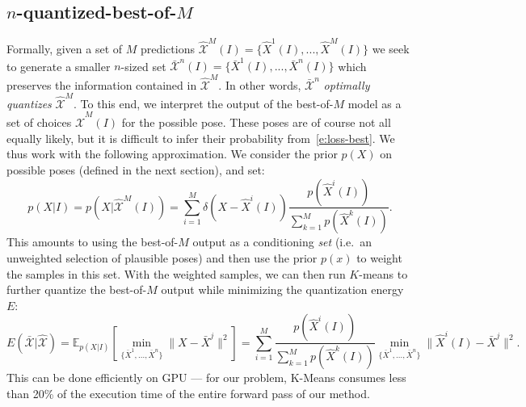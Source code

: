 \subsection{$n$-quantized-best-of-$M$}
Formally, given a set of $M$ predictions
$\mathcal{\hat X}^M(I) = \{\hat X^1(I), ..., \hat X^M(I)\}$ we seek to generate a smaller $n$-sized set
$\mathcal{\bar X}^n(I) = \{\bar X^1(I), ..., \bar X^n(I)\}$ which preserves the information contained in $\mathcal{\hat X}^M$.
In other words, $\mathcal{\bar X}^n$ \emph{optimally quantizes} $\mathcal{\hat X}^M$.
%
To this end, we interpret the output of the best-of-$M$ model as a set of choices $\mathcal{\hat X}^M(I)$ for the possible pose.
These poses are of course not all equally likely, but it is difficult to infer their probability from~\eqref{e:loss-best}.
We thus work with the following approximation.
We consider the prior $p(X)$ on possible poses (defined in the next section), and set:
\begin{equation}\label{e:conditional}
p(X|I)
=
p(X|\mathcal{\hat X}^M(I))
=
\sum_{i=1}^{M}
\delta({X} - \hat{X}^i(I))
\frac{p(\hat{X}^i(I))}{
\sum_{k=1}^{M} p(\hat{X}^k(I))}.
\end{equation}
This amounts to using the best-of-$M$ output as a conditioning \emph{set} (i.e.~an unweighted selection of plausible poses) and then use the prior $p(x)$ to weight the samples in this set.
With the weighted samples, we can then run $K$-means \cite{lloyd1982least} to further quantize the best-of-$M$ output while minimizing the quantization energy $E$:
\begin{equation}\label{e:loss-quant}
E(\mathcal{\bar X} | \mathcal{\hat X}) = \mathbb{E}_{p(X|I)}
\left[
    \min_{\{\bar X^1, ..., \bar X^n\}} \| X - \bar X^j \|^2
\right]
=
\sum_{i=1}^{M}
\frac{p(\hat{X}^i(I))}{
\sum_{k=1}^{M} p(\hat{X}^k(I))}
\min_{\{\bar X^1,\dots,\bar X^n\}}
\| \hat X^i(I) - \bar X^j \|^2.
\end{equation}
This can be done efficiently on GPU --- for our problem, K-Means consumes less than 20\% of the execution time of the entire forward pass of our method. 

